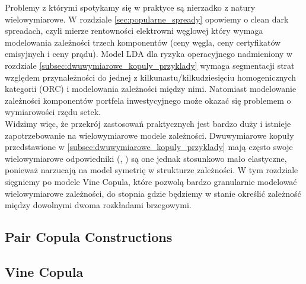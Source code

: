 Problemy z którymi spotykamy się w praktyce są nierzadko z natury wielowymiarowe. W rozdziale \ref{sec:popularne_spready} opowiemy o clean dark spreadach, czyli mierze rentowności elektrowni węglowej który wymaga modelowania zależności trzech komponentów (ceny węgla, ceny certyfikatów emisyjnych i ceny prądu). Model LDA dla ryzyka operacyjnego nadmieniony w rozdziale \ref{subsec:dwuwymiarowe_kopuly_przyklady} wymaga segmentacji strat względem przynależności do jednej z kilkunastu/kilkudziesięciu homogenicznych kategorii (ORC) i modelowania zależności między nimi. Natomiast modelowanie zależności komponentów portfela inwestycyjnego może okazać się problemem o wymiarowości rzędu setek.\\
Widzimy więc, że przekrój zastosowań praktycznych jest bardzo duży i istnieje zapotrzebowanie na wielowymiarowe modele zależności. Dwuwymiarowe kopuły przedstawione w \ref{subsec:dwuwymiarowe_kopuly_przyklady} mają często swoje wielowymiarowe odpowiedniki (\cite{Cherubini_Copula_Methods_in_Finance}, \cite{Kurowicka_Dependence_Modeling}) są one jednak stosunkowo mało elastyczne, ponieważ narzucają na model symetrię w strukturze zależności. W tym rozdziale sięgniemy po modele Vine Copula, które pozwolą bardzo granularnie modelować wielowymiarowe zależności, do stopnia gdzie będziemy w stanie określić zależność między dowolnymi dwoma rozkładami brzegowymi.\\

\subsection{Pair Copula Constructions}
\label{subsec:pair_copula_constructions}

	
\subsection{Vine Copula}
\label{subsec:vine_copula}

